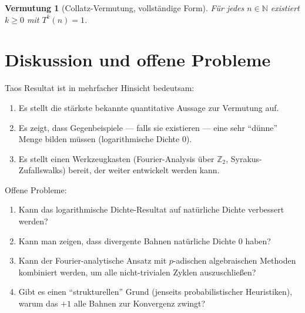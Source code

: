 \documentclass[12pt,a4paper]{article}
\newtheorem{conjecture}[theorem]{Vermutung}
\begin{document}
\begin{conjecture}[Collatz-Vermutung, vollständige Form]\label{conj:vollstaendig}
Für jedes $n \in \mathbb{N}$ existiert $k \geq 0$ mit $T^k(n) = 1$.
\end{conjecture}

\section{Diskussion und offene Probleme}

Taos Resultat ist in mehrfacher Hinsicht bedeutsam:
\begin{enumerate}
  \item Es stellt die stärkste bekannte quantitative Aussage zur Vermutung auf.
  \item Es zeigt, dass Gegenbeispiele --- falls sie existieren --- eine sehr ``dünne''
        Menge bilden müssen (logarithmische Dichte 0).
  \item Es stellt einen Werkzeugkasten (Fourier-Analysis über $\mathbb{Z}_2$,
        Syrakus-Zufallswalks) bereit, der weiter entwickelt werden kann.
\end{enumerate}

Offene Probleme:
\begin{enumerate}
  \item Kann das logarithmische Dichte-Resultat auf natürliche Dichte verbessert werden?
  \item Kann man zeigen, dass divergente Bahnen natürliche Dichte 0 haben?
  \item Kann der Fourier-analytische Ansatz mit $p$-adischen algebraischen Methoden
        kombiniert werden, um alle nicht-trivialen Zyklen auszuschließen?
  \item Gibt es einen ``strukturellen'' Grund (jenseits probabilistischer Heuristiken),
        warum das $+1$ alle Bahnen zur Konvergenz zwingt?
\end{enumerate}
\end{document}
